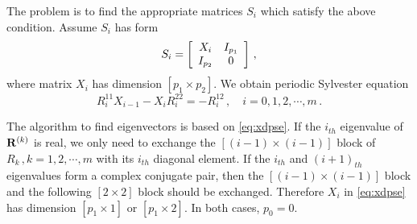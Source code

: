 \documentclass[final,leqno,onefignum,onetabnum]{siamltexmm}
\begin{document}
The problem is to find the appropriate matrices $S_{i}$ which satisfy
the above condition. Assume $S_{i}$ has form
\[
S_{i}=
\left[
\begin{array}{c c}
  X_{i} & I_{p_{1}} \\
  I_{p_{2}} & 0
\end{array}
\right]
\,,
\]
where matrix $X_{i}$ has dimension $[p_{1}\!\times\! p_{2}]$. We obtain
periodic Sylvester equation
\begin{equation}
  \label{eq:xdpse}
  R^{11}_{i}X_{i-1}-X_{i}R^{22}_{i}=-R^{12}_{i}
  \,,\quad i=0,1,2,\cdots,m
  \,.
\end{equation}

The algorithm to find eigenvectors is based on \eqref{eq:xdpse}. If the
$i_{th}$ eigenvalue of $\mathbf{R}^{(k)}$ is real, we only need to exchange the
 $[(i-1)\!\times\! (i-1)]$ block of $R_{k}\,,k=1,2,\cdots,m$ with
its $i_{th}$ diagonal element. If the $i_{th}$ and $(i+1)_{th}$
eigenvalues form a complex conjugate pair,
then the  $[(i-1)\!\times\! (i-1)]$
block and the following $[2\!\times\! 2]$ block should be exchanged.
Therefore $X_{i}$ in \eqref{eq:xdpse} has dimension $[p_{1}\!\times\! 1]$
or $[p_{1}\!\times\! 2]$. In both cases, $p_{0}=0$.
\end{document}
